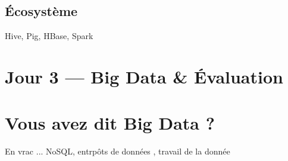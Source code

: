 \documentclass[utf8,12pt,draft]{article}
\begin{document}
\subsection{\'Ecosyst\`eme}
{\sc Hive}\cite{wikihive}, {\sc Pig}\cite{wikipig}, {\sc HBase}\cite{wikihbase},
{\sc Spark}\cite{wikispark}


\section{Jour 3 --- Big Data \& \'Evaluation}

\section{Vous avez dit {\sc Big Data} \cite{wikibigdata} ?}
En vrac ... NoSQL\cite{wikinosql}, entrp\^ots de données \cite{wikientrepot}
\cite{wikidatamart}, travail de la donnée \cite{wikiinfodeci} \cite{wikiexplodonnees}
\cite{wikiai} \cite{wikidatasci}



\end{document}

